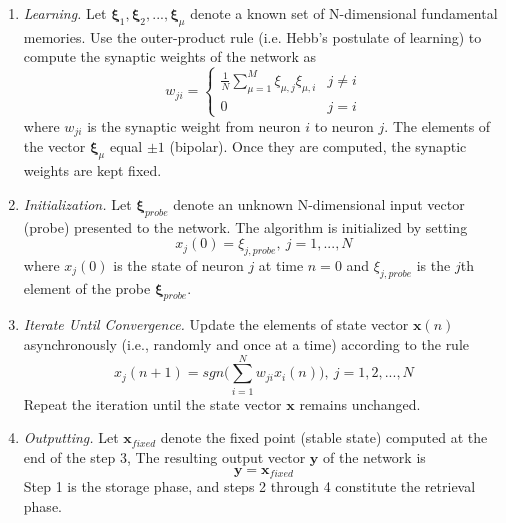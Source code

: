 \documentclass[letterpaper]{article}
\numberwithin{equation}{section}
\begin{document}
\begin{enumerate}
	\item \textit{Learning.} Let \( \boldsymbol{\xi}_1, \boldsymbol{\xi}_2, ..., \boldsymbol{\xi}_{\mu} \) denote a known set of N-dimensional fundamental memories. Use the outer-product rule (i.e. Hebb's postulate of learning) to compute the synaptic weights of the network as 
	\begin{equation}
		w_{ji} =
			\begin{cases}
				\frac{1}{N} \sum_{\mu=1}^{M}\xi_{\mu,j}\xi_{\mu,i}	& j \neq i \\
				0																										& j = i 
			\end{cases}
	\end{equation}
	where \(w_{ji}\) is the synaptic weight from neuron \(i\) to neuron \(j\). The elements of the vector \( \boldsymbol{\xi}_\mu \) equal \(\pm 1\) (bipolar). Once they are computed, the synaptic weights are kept fixed.
	
	\item \textit{Initialization.} Let \( \boldsymbol{\xi}_{probe} \) denote an unknown N-dimensional input vector (probe) presented to the network. The algorithm is initialized by setting
	\begin{equation}
		x_j(0) = \xi_{j,probe}, \> j = 1,...,N
	\end{equation}
	where \( x_j(0) \) is the state of neuron \(j\) at time \(n = 0\) and \( \xi_{j,probe} \) is the \(j\)th element of the probe \( \boldsymbol{\xi}_{probe} \).
	
	\item \textit{Iterate Until Convergence.} Update the elements of state vector \( \boldsymbol{x}(n) \) asynchronously (i.e., randomly and once at a time) according to the rule
	\begin{equation}
		x_j(n+1)=sgn \Bigg(\sum_{i=1}^{N} w_{ji}x_i(n) \Bigg), \> j = 1,2, ..., N
	\end{equation}
	Repeat the iteration until the state vector \( \boldsymbol{x} \) remains unchanged.
	
	\item \textit{Outputting.} Let \( \boldsymbol{x}_{fixed} \) denote the fixed point (stable state) computed at the end of the step 3, The resulting output vector \( \boldsymbol{y} \) of the network is
	\begin{equation}
		\boldsymbol{y} = \boldsymbol{x}_{fixed}
	\label{eq:}
	\end{equation}
	Step 1 is the storage phase, and steps 2 through 4 constitute the retrieval phase.
\end{enumerate}
\end{document}
